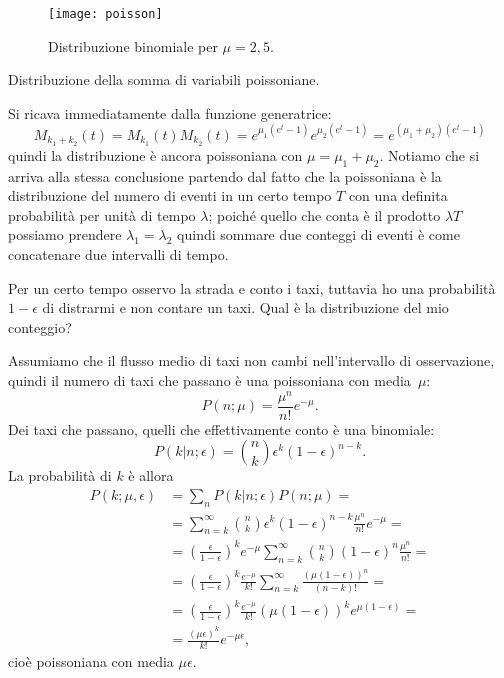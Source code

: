 \begin{figure}
	\centering
	\texttt{[image: poisson]}
	\caption{Distribuzione binomiale per $\mu=2,5$.}
\end{figure}

\begin{exercise}
	Distribuzione della somma di variabili poissoniane.
\end{exercise}

\begin{solution}
	Si ricava immediatamente dalla funzione generatrice:
	\begin{equation*}
		M_{k_1+k_2}(t) =
		M_{k_1}(t)M_{k_2}(t) =
		e^{\mu_1(e^t-1)} e^{\mu_2(e^t-1)} =
		e^{(\mu_1+\mu_2)(e^t-1)}
	\end{equation*}
	quindi la distribuzione è ancora poissoniana con $\mu=\mu_1+\mu_2$.
	Notiamo che si arriva alla stessa conclusione partendo dal fatto che la poissoniana è la distribuzione del numero di eventi in un certo tempo $T$ con una definita probabilità per unità di tempo $\lambda$; poiché quello che conta è il prodotto $\lambda T$ possiamo prendere $\lambda_1=\lambda_2$ quindi sommare due conteggi di eventi è come concatenare due intervalli di tempo.
\end{solution}

\begin{exercise}
	Per un certo tempo osservo la strada e conto i taxi,
	tuttavia ho una probabilità $1-\epsilon$ di distrarmi e non contare un taxi.
	Qual è la distribuzione del mio conteggio?
\end{exercise}

\begin{solution*}
	Assumiamo che il flusso medio di taxi non cambi nell'intervallo di osservazione,
	quindi il numero di taxi che passano è una poissoniana con media~$\mu$:
	\begin{equation*}
		P(n;\mu) = \frac{\mu^n}{n!}e^{-\mu}.
	\end{equation*}
	Dei taxi che passano, quelli che effettivamente conto è una binomiale:
	\begin{equation*}
		P(k|n;\epsilon) = \binom nk \epsilon^k (1-\epsilon)^{n-k}.
	\end{equation*}
	La probabilità di $k$ è allora
	\begin{align*}
		P(k;\mu,\epsilon) &=
		\sum_n P(k|n;\epsilon) P(n;\mu) = \\
		&= \sum_{n=k}^\infty \binom nk \epsilon^k (1-\epsilon)^{n-k} \frac{\mu^n}{n!}e^{-\mu} = \\
		&= \left( \frac\epsilon{1-\epsilon} \right)^k e^{-\mu} \sum_{n=k}^\infty \binom nk (1-\epsilon)^n \frac{\mu^n}{n!} = \\
		&= \left( \frac\epsilon{1-\epsilon} \right)^k \frac{e^{-\mu}}{k!} \sum_{n=k}^\infty \frac{(\mu(1-\epsilon))^n}{(n-k)!} = \\
		&= \left( \frac\epsilon{1-\epsilon} \right)^k \frac{e^{-\mu}}{k!} (\mu(1-\epsilon))^k e^{\mu(1-\epsilon)} = \\
		&= \frac{(\mu\epsilon)^k}{k!}e^{-\mu\epsilon},
	\end{align*}
	cioè poissoniana con media $\mu\epsilon$.
\end{solution*}

